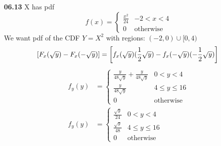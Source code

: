 {\bf 06.13}
X has pdf 
\begin{equation*}
f(x)= 
\begin{cases}
     \frac{x^{2}}{24} & -2<x<4 \\
     0 				  & \text{otherwise}
\end{cases}
\end{equation*}
We want pdf of the CDF $ Y=X^{2} $ 
with regions: $ (-2,0) \cup [0,4) $
\begin{equation*}
\left[ F_{x}(\sqrt{y})-F_{x}(-\sqrt{y}) \right]  = 
\left[ f_{x}(\sqrt{y})(\frac{1}{2}\sqrt{y})-f_{x}(-\sqrt{y})(-\frac{1}{2}\sqrt{y}) \right] \\
\end{equation*}
\begin{equation*}
\begin{split}
f_{y}(y) & = 
\begin{cases}
	\frac{y}{48\sqrt{y}}+\frac{y}{48\sqrt{y}} & 0<y<4 \\
	\frac{y}{48\sqrt{y}}                      & 4 \leq y \leq 16 \\
	0                                         & \text{otherwise} 
\end{cases}
\\
f_{y}(y) & =
\begin{cases}
	\frac{\sqrt{y}}{24}                      & 0<y<4 \\
	\frac{\sqrt{y}}{48}                      & 4 \leq y \leq 16 \\
	0                                        & \text{otherwise} 
\end{cases}
\end{split}
\end{equation*}
